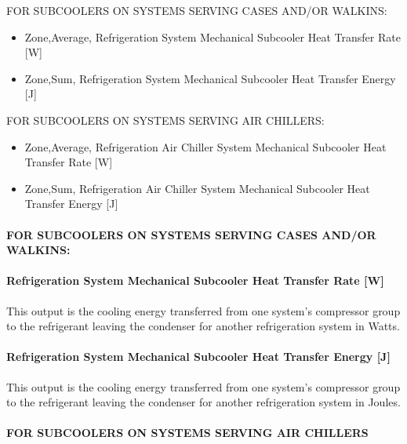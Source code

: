 FOR SUBCOOLERS ON SYSTEMS SERVING CASES AND/OR WALKINS:

\begin{itemize}
\item
  Zone,Average, Refrigeration System Mechanical Subcooler Heat Transfer Rate {[}W{]}
\item
  Zone,Sum, Refrigeration System Mechanical Subcooler Heat Transfer Energy {[}J{]}
\end{itemize}

FOR SUBCOOLERS ON SYSTEMS SERVING AIR CHILLERS:

\begin{itemize}
\item
  Zone,Average, Refrigeration Air Chiller System Mechanical Subcooler Heat Transfer Rate {[}W{]}
\item
  Zone,Sum, Refrigeration Air Chiller System Mechanical Subcooler Heat Transfer Energy {[}J{]}
\end{itemize}

\paragraph{FOR SUBCOOLERS ON SYSTEMS SERVING CASES AND/OR WALKINS:}\label{for-subcoolers-on-systems-serving-cases-andor-walkins}

\paragraph{Refrigeration System Mechanical Subcooler Heat Transfer Rate {[}W{]}}\label{refrigeration-system-mechanical-subcooler-heat-transfer-rate-w}

This output is the cooling energy transferred from one system's compressor group to the refrigerant leaving the condenser for another refrigeration system in Watts.

\paragraph{Refrigeration System Mechanical Subcooler Heat Transfer Energy {[}J{]}}\label{refrigeration-system-mechanical-subcooler-heat-transfer-energy-j}

This output is the cooling energy transferred from one system's compressor group to the refrigerant leaving the condenser for another refrigeration system in Joules.

\paragraph{FOR SUBCOOLERS ON SYSTEMS SERVING AIR CHILLERS}\label{for-subcoolers-on-systems-serving-air-chillers}

